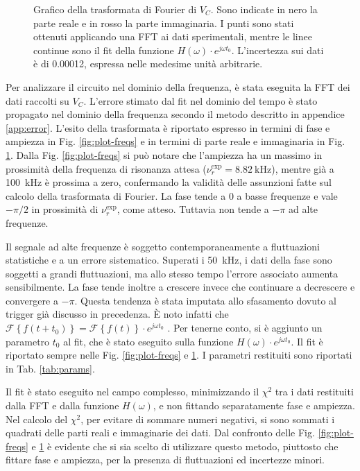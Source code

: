 \documentclass[12pt,a4paper, twocolumn]{article}
\newcommand{\fourier}[1]{\mathcal{F}\left\{#1\right\}}
\begin{document}
\begin{figure}[t]

\caption{Grafico della trasformata di Fourier di $V_C$. Sono indicate in nero la parte reale e in rosso la parte immaginaria. I punti sono stati ottenuti applicando una FFT ai dati sperimentali, mentre le linee continue sono il fit della funzione $H(\omega) \cdot e^{j\omega t_0}$. L'incertezza sui dati è di 0.00012, espressa nelle medesime unità arbitrarie.}
\label{fig:plot-realimag}
\end{figure}

Per analizzare il circuito nel dominio della frequenza, è stata eseguita la FFT dei dati raccolti su $V_C$. L'errore stimato dal fit nel dominio del tempo è stato propagato nel dominio della frequenza secondo il metodo descritto in appendice \ref{app:error}. L'esito della trasformata è riportato espresso in termini di fase e ampiezza in Fig. \ref{fig:plot-freqs} e in termini di parte reale e immaginaria in Fig. \ref{fig:plot-realimag}. Dalla Fig. \ref{fig:plot-freqs} si può notare che l'ampiezza ha un massimo in prossimità della frequenza di risonanza attesa ($\nu_r^\text{exp} = \SI{8.82}{\kilo\hertz}$), mentre già a \SI{100}{\kilo\hertz} è prossima a zero, confermando la validità delle assunzioni fatte sul calcolo della trasformata di Fourier. La fase tende a 0 a basse frequenze e vale $-\pi/2$ in prossimità di $\nu_r^\text{exp}$, come atteso. Tuttavia non tende a $-\pi$ ad alte frequenze.

Il segnale ad alte frequenze è soggetto contemporaneamente a fluttuazioni statistiche e a un errore sistematico. Superati i \SI{50}{\kilo\hertz}, i dati della fase sono soggetti a grandi fluttuazioni, ma allo stesso tempo l'errore associato aumenta sensibilmente. La fase tende inoltre a crescere invece che continuare a decrescere e convergere a $-\pi$. Questa tendenza è stata imputata allo sfasamento dovuto al trigger già discusso in precedenza. È noto infatti che $\fourier{f(t+t_0)} = \fourier{f(t)} \cdot e^{j \omega t_0}$ \cite{fourier}. Per tenerne conto, si è aggiunto un parametro $t_0$ al fit, che è stato eseguito sulla funzione $H(\omega) \cdot e^{j \omega t_0}$. Il fit è riportato sempre nelle Fig. \ref{fig:plot-freqs} e \ref{fig:plot-realimag}. I parametri restituiti sono riportati in Tab. \ref{tab:params}.

Il fit è stato eseguito nel campo complesso, minimizzando il $\chi^2$ tra i dati restituiti dalla FFT e dalla funzione $H(\omega)$, e non fittando separatamente fase e ampiezza. Nel calcolo del $\chi^2$, per evitare di sommare numeri negativi, si sono sommati i quadrati delle parti reali e immaginarie dei dati. Dal confronto delle Fig. \ref{fig:plot-freqs} e \ref{fig:plot-realimag} è evidente che si sia scelto di utilizzare questo metodo, piuttosto che fittare fase e ampiezza, per la presenza di fluttuazioni ed incertezze minori.
\end{document}
